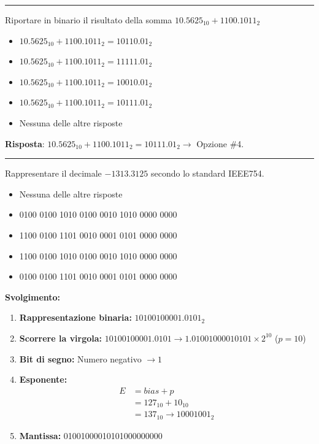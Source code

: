 \documentclass[12pt, a4paper]{article}
\begin{document}
\vspace{0.5cm}
\hrule
\vspace{0.5cm}

Riportare in binario il risultato della somma $10.5625_{10} + 1100.1011_2$
\begin{itemize}
    \item[$\square$] $10.5625_{10} + 1100.1011_2 = 10110.01_2$
    \item[$\square$] $10.5625_{10} + 1100.1011_2 = 11111.01_2$
    \item[$\square$] $10.5625_{10} + 1100.1011_2 = 10010.01_2$
    \item[$\blacksquare$] $10.5625_{10} + 1100.1011_2 = 10111.01_2$
    \item[$\square$] Nessuna delle altre risposte
\end{itemize}
\textbf{Risposta}: $10.5625_{10} + 1100.1011_2 = 10111.01_2 \rightarrow$ Opzione \#4.

\vspace{0.5cm}
\hrule
\vspace{0.5cm}

Rappresentare il decimale $-1313.3125$ secondo lo standard IEEE754.
\begin{itemize}
    \item[$\square$] Nessuna delle altre risposte
    \item[$\square$] 0100 0100 1010 0100 0010 1010 0000 0000
    \item[$\square$] 1100 0100 1101 0010 0001 0101 0000 0000
    \item[$\blacksquare$] 1100 0100 1010 0100 0010 1010 0000 0000
    \item[$\square$] 0100 0100 1101 0010 0001 0101 0000 0000
\end{itemize}

\textbf{Svolgimento:}
\begin{enumerate}
    \item \textbf{Rappresentazione binaria:} $10100100001.0101_2$
    \item \textbf{Scorrere la virgola:}
    $10100100001.0101 \rightarrow 1.01001000010101 \times 2^{10}$ ($p=10$)
    \item \textbf{Bit di segno:} Numero negativo $\rightarrow 1$
    \item \textbf{Esponente:}
    \begin{align*}
    E &= bias + p \\
      &= 127_{10} + 10_{10} \\
      &= 137_{10} \rightarrow 10001001_2
    \end{align*}
    \item \textbf{Mantissa:} 01001000010101000000000
\end{enumerate}
\end{document}
